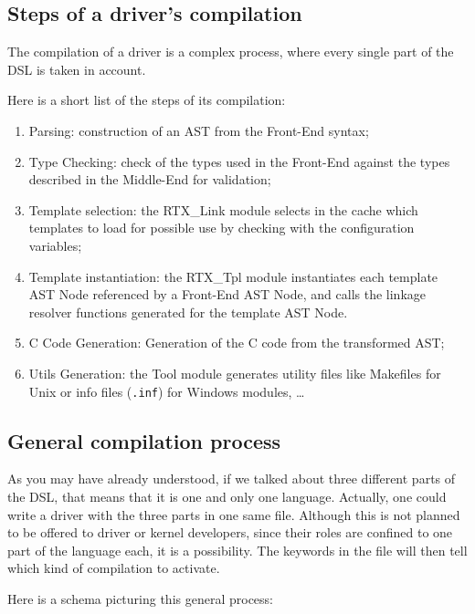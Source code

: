 \documentclass[american]{rtxreport}
\begin{document}
\subsection{Steps of a driver's compilation}
\label{sec:driverCompilation}

The compilation of a driver is a complex process, where every single part of
the DSL is taken in account.

Here is a short list of the steps of its compilation:
\begin{enumerate}
    \item Parsing: construction of an AST from the Front-End syntax;
    \item Type Checking: check of the types used in the Front-End against the
        types described in the Middle-End for validation;
    \item Template selection: the RTX\_Link module selects in the cache which
        templates to load for possible use by checking with the configuration
        variables;
    \item Template instantiation: the RTX\_Tpl module instantiates each
        template AST Node referenced by a Front-End AST Node, and calls the
        linkage resolver functions generated for the template AST Node.
    \item C Code Generation: Generation of the C code from the transformed
        AST;
    \item Utils Generation: the Tool module generates utility files like
        Makefiles for Unix or info files (\texttt{.inf}) for Windows modules,
        \ldots
\end{enumerate}


\subsection{General compilation process}

As you may have already understood, if we talked about three different parts of
the DSL, that means that it is one and only one language. Actually, one could
write a driver with the three parts in one same file. Although this is not
planned to be offered to driver or kernel developers, since their roles are
confined to one part of the language each, it is a possibility. The keywords in
the file will then tell which kind of compilation to activate.

Here is a schema picturing this general process:
\end{document}
